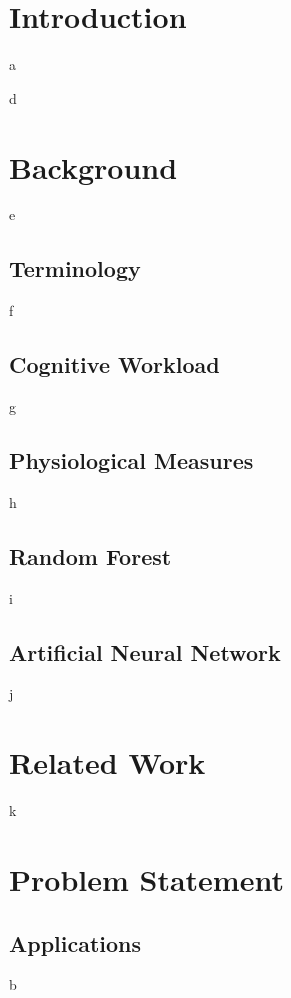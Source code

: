 \documentclass[11pt]{article}
\begin{document}
\section{Introduction}
a
	
d		

\section{Background}
e
	\subsection{Terminology}
f	
	\subsection{Cognitive Workload}
g	
	\subsection{Physiological Measures}
h	
	\subsection{Random Forest}
i	
	\subsection{Artificial Neural Network}
j
\section{Related Work}
k
\section{Problem Statement}
	\subsection{Applications}
b	
\end{document}

